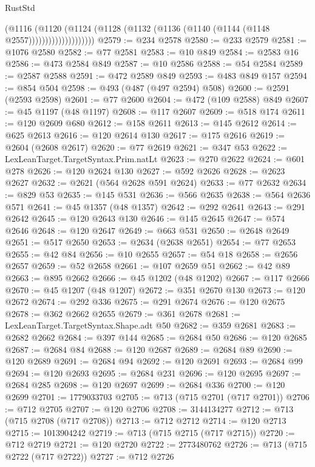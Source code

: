 \begin{lexlean}{RustStd}
\begin{coremodule}
{\begin{coremodule}
{{{{{{{{{{{{{{{{{{{{{{{{{{{{{{{{{{{{{{{{{{{{{{{{{{{{{{{{{{{{                          (@1116
                            (@1120
                              (@1124
                                (@1128 (@1132 (@1136 (@1140 (@1144 (@1148 @2557))))))))))))))))))))
@2579 := @234 @2578
@2580 := @233 @2579
@2581 := @1076 @2580
@2582 := @77 @2581
@2583 := @10 @849
@2584 := @2583 @16
@2586 := @473 @2584 @849
@2587 := @10 @2586
@2588 := @54 @2584
@2589 := @2587 @2588
@2591 := @472 @2589 @849
@2593 := @483 @849 @157
@2594 := @854 @504
@2598 := @493 (@487 (@497 @2594) @508)
@2600 := @2591 (@2593 @2598)
@2601 := @77 @2600
@2604 := @472 (@109 @2588) @849
@2607 := @45 @1197 (@48 @1197)
@2608 := @117 @2607
@2609 := @518 @174
@2611 := @120 @2609 @680
@2612 := @158 @2611
@2613 := @145 @2612
@2614 := @625 @2613
@2616 := @120 @2614 @130
@2617 := @175 @2616
@2619 := @2604 (@2608 @2617)
@2620 := @77 @2619
@2621 := @347 @53
@2622 := LexLeanTarget.TargetSyntax.Prim.natLt
@2623 := @270 @2622
@2624 := @601 @278
@2626 := @120 @2624 @130
@2627 := @592 @2626
@2628 := @2623 @2627
@2632 := @2621 (@564 @2628 @591 @2624)
@2633 := @77 @2632
@2634 := @829 @53
@2635 := @145 @531
@2636 := @566 @2635
@2638 := @564 @2636 @571
@2641 := @45 @1357 (@48 @1357)
@2642 := @292 @2641
@2643 := @291 @2642
@2645 := @120 @2643 @130
@2646 := @145 @2645
@2647 := @574 @2646
@2648 := @120 @2647
@2649 := @663 @531
@2650 := @2648 @2649
@2651 := @517 @2650
@2653 := @2634 (@2638 @2651)
@2654 := @77 @2653
@2655 := @42 @84
@2656 := @10 @2655
@2657 := @54 @18
@2658 := @2656 @2657
@2659 := @52 @2658
@2661 := @107 @2659 @51
@2662 := @42 @89
@2663 := @895 @2662
@2666 := @45 @1202 (@48 @1202)
@2667 := @117 @2666
@2670 := @45 @1207 (@48 @1207)
@2672 := @351 @2670 @130
@2673 := @120 @2672
@2674 := @292 @336
@2675 := @291 @2674
@2676 := @120 @2675
@2678 := @362 @2662 @2655
@2679 := @361 @2678
@2681 := LexLeanTarget.TargetSyntax.Shape.adt @50
@2682 := @359 @2681
@2683 := @2682 @2662
@2684 := @397 @144
@2685 := @2684 @50
@2686 := @120 @2685
@2687 := @2684 @84
@2688 := @120 @2687
@2689 := @2684 @89
@2690 := @120 @2689
@2691 := @2684 @94
@2692 := @120 @2691
@2693 := @2684 @99
@2694 := @120 @2693
@2695 := @2684 @231
@2696 := @120 @2695
@2697 := @2684 @285
@2698 := @120 @2697
@2699 := @2684 @336
@2700 := @120 @2699
@2701 := 1779033703
@2705 := @713 (@715 @2701 (@717 @2701))
@2706 := @712 @2705
@2707 := @120 @2706
@2708 := 3144134277
@2712 := @713 (@715 @2708 (@717 @2708))
@2713 := @712 @2712
@2714 := @120 @2713
@2715 := 1013904242
@2719 := @713 (@715 @2715 (@717 @2715))
@2720 := @712 @2719
@2721 := @120 @2720
@2722 := 2773480762
@2726 := @713 (@715 @2722 (@717 @2722))
@2727 := @712 @2726
}}}}}}}}}}}}}}}}}}}}}}}}}}}}}}}}}}}}}}}}}}}}}}}}}}}}}}}}}}}}
\end{coremodule}}
\end{coremodule}
\end{lexlean}
